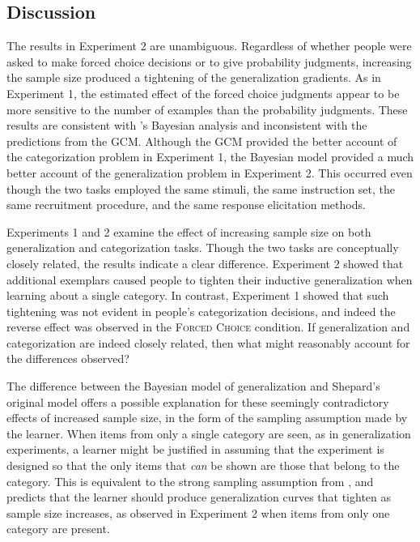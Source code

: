 \documentclass[doc,apacite]{apa6}
\newcommand{\possessivecite}[1]{\citeauthor{#1}'s \citeyear{#1}}
\begin{document}
\subsection{Discussion}

The results in Experiment 2 are unambiguous. Regardless of whether people were asked to make forced choice decisions or to give probability judgments, increasing the sample size produced a tightening of the generalization gradients. As in Experiment 1, the estimated effect of the forced choice judgments appear to be more sensitive to the number of examples than the probability judgments. These results are consistent with \possessivecite{tenenbaum2001generalization} Bayesian analysis and inconsistent with the predictions from the GCM. Although the GCM provided the better account of the categorization problem in Experiment 1, the Bayesian model provided a much better account of the generalization problem in Experiment 2. This occurred even though the two tasks employed the same stimuli, the same instruction set, the same recruitment procedure, and the same response elicitation methods.

Experiments 1 and 2 examine the effect of increasing sample size on both generalization and categorization tasks.
Though the two tasks are conceptually closely related, the results indicate a clear difference.
Experiment 2 showed that additional exemplars caused people to tighten their inductive generalization when learning about a single category.
In contrast, Experiment 1 showed that such tightening was not evident in  people's categorization decisions, and indeed the reverse effect was observed in the {\textsc{Forced Choice}} condition.
If generalization and categorization are indeed closely related, then what might reasonably account for the differences observed?

The difference between the Bayesian model of generalization and Shepard's original model offers a possible explanation for these seemingly contradictory effects of increased sample size, in the form of the sampling assumption made by the learner.
When items from only a single category are seen, as in generalization experiments, a learner might be justified in assuming that the experiment is designed so that the only items that \textit{can} be shown are those that belong to the category.
This is equivalent to the strong sampling assumption from , and predicts that the learner should produce generalization curves that tighten as sample size increases, as observed in Experiment 2 when items from only one category are present.
\end{document}

